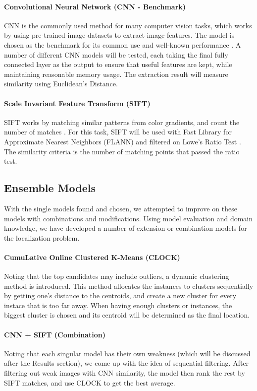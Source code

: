 \documentclass[11pt]{article}
\begin{document}
\begin{multicols}{2}
\paragraph{Convolutional Neural Network (CNN - Benchmark)} CNN is the commonly used method for many computer vision tasks, which works by using pre-trained image datasets to extract image features. The model is chosen as the benchmark for its common use and well-known performance \cite{cnn}. A number of different CNN models will be tested, each taking the final fully connected layer as the output to ensure that useful features are kept, while maintaining reasonable memory usage. The extraction result will measure similarity using Euclidean's Distance.
\vspace{-0.4cm}
\paragraph{Scale Invariant Feature Transform (SIFT)} SIFT works by matching similar patterns from color gradients, and count the number of matches \cite{sift}. For this task, SIFT will be used with Fast Library for Approximate Nearest Neighbors (FLANN) and filtered on Lowe's Ratio Test \cite{Lowe}. The similarity criteria is the number of matching points that passed the ratio test.

\subsection{Ensemble Models}
\noindent With the single models found and chosen, we attempted to improve on these models with combinations and modifications. Using model evaluation and domain knowledge, we have developed a number of extension or combination models for the localization problem.
\vspace{-0.4cm}
\paragraph{CumuLative Online Clustered K-Means (CLOCK)} Noting that the top candidates may include outliers, a dynamic clustering method is introduced. This method allocates the instances to clusters sequentially by getting one's distance to the centroids, and create a new cluster for every instace that is too far away. When having enough clusters or instances, the biggest cluster is chosen and its centroid will be determined as the final location.
\vspace{-0.4cm}
\paragraph{CNN + SIFT (Combination)} Noting that each singular model has their own weakness (which will be discussed after the Results section), we come up with the idea of sequential filtering. After filtering out weak images with CNN similarity, the model then rank the rest by SIFT matches, and use CLOCK to get the best average.
\vspace{-0.4cm}

\end{multicols}
\end{document}
